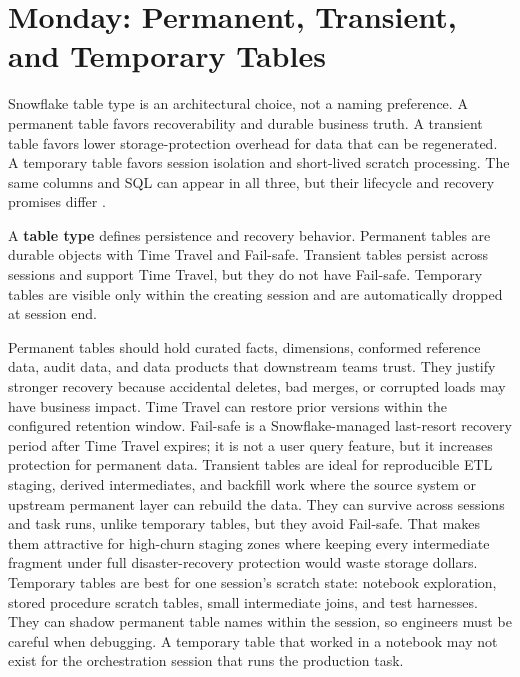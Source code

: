 \section{Monday: Permanent, Transient, and Temporary Tables}
Snowflake table type is an architectural choice, not a naming preference. A permanent table favors recoverability and durable business truth. A transient table favors lower storage-protection overhead for data that can be regenerated. A temporary table favors session isolation and short-lived scratch processing. The same columns and SQL can appear in all three, but their lifecycle and recovery promises differ \cite{snowflakeTableTypesDocs}.
\begin{definitionbox}
A \textbf{table type} defines persistence and recovery behavior. Permanent tables are durable objects with Time Travel and Fail-safe. Transient tables persist across sessions and support Time Travel, but they do not have Fail-safe. Temporary tables are visible only within the creating session and are automatically dropped at session end.
\end{definitionbox}
Permanent tables should hold curated facts, dimensions, conformed reference data, audit data, and data products that downstream teams trust. They justify stronger recovery because accidental deletes, bad merges, or corrupted loads may have business impact. Time Travel can restore prior versions within the configured retention window. Fail-safe is a Snowflake-managed last-resort recovery period after Time Travel expires; it is not a user query feature, but it increases protection for permanent data.
Transient tables are ideal for reproducible ETL staging, derived intermediates, and backfill work where the source system or upstream permanent layer can rebuild the data. They can survive across sessions and task runs, unlike temporary tables, but they avoid Fail-safe. That makes them attractive for high-churn staging zones where keeping every intermediate fragment under full disaster-recovery protection would waste storage dollars.
Temporary tables are best for one session's scratch state: notebook exploration, stored procedure scratch tables, small intermediate joins, and test harnesses. They can shadow permanent table names within the session, so engineers must be careful when debugging. A temporary table that worked in a notebook may not exist for the orchestration session that runs the production task.

